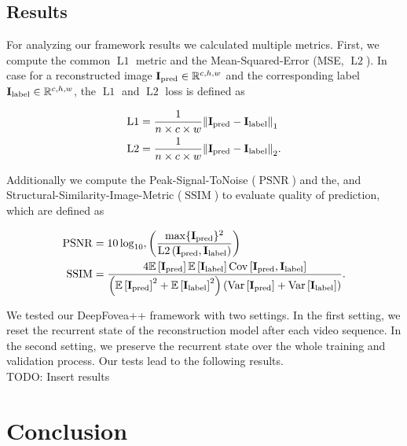 \documentclass[10pt,twocolumn,letterpaper]{article}
\newcommand{\Tensor}[1]{\boldsymbol{\mathrm{\MakeUppercase{#1}}}}
\newcommand{\Set}[1]{\mathbb{#1}}
\newcommand{\Mean}[1]{\mathbb{E}\left[#1\right]}
\newcommand{\Var}[1]{\mathrm{Var}\left[#1\right]}
\newcommand{\Cov}[1]{\mathrm{Cov}\left[#1\right]}
\begin{document}
\subsection{Results} %
For analyzing our framework results we calculated multiple metrics. First, we compute the common $\operatorname{L1}$ metric and the Mean-Squared-Error (MSE, $\operatorname{L2}$). In case for a reconstructed image $\Tensor{I}_{\text{pred}}\in\Set{R}^{c, h, w}$ and the corresponding label $\Tensor{I}_{\text{label}}\in\Set{R}^{c, h, w}$, the $\operatorname{L1}$ and $\operatorname{L2}$ loss is defined as

\begin{align}
    \operatorname{L1} &= \frac{1}{n\times c\times w}\norm{\Tensor{I}_{\text{pred}} - \Tensor{I}_{\text{label}}}_{1}\\
    \operatorname{L2} &= \frac{1}{n\times c\times w}\norm{\Tensor{I}_{\text{pred}} - \Tensor{I}_{\text{label}}}_{2}.
\end{align}

Additionally we compute the Peak-Signal-ToNoise ($\operatorname{PSNR}$) and the, and Structural-Similarity-Image-Metric ($\operatorname{SSIM}$) \cite{ssmi} to evaluate quality of prediction, which are defined as

\begin{align}
    \operatorname{PSNR}&=10 \log_{10},\left(\frac{\max\{\Tensor{I}_{\text{pred}}\}^2}{\operatorname{L2}\left(\Tensor{I}_{\text{pred}}, \Tensor{I}_{\text{label}}\right)} \right)\\
    \operatorname{SSIM}&=\frac{4\Mean{\Tensor{I}_{\text{pred}}}\Mean{\Tensor{I}_{\text{label}}}\Cov{\Tensor{I}_{\text{pred}}, \Tensor{I}_{\text{label}}}}{\left(\Mean{\Tensor{I}_{\text{pred}}}^2 + \Mean{\Tensor{I}_{\text{label}}}^2\right)\left(\Var{\Tensor{I}_{\text{pred}}} + \Var{\Tensor{I}_{\text{label}}}\right)}.
\end{align}

We tested our DeepFovea++ framework with two settings. In the first setting, we reset the recurrent state of the reconstruction model after each video sequence. In the second setting, we preserve the recurrent state over the whole training and validation process. Our tests lead to the following results.\\

TODO: Insert results\\

\section{Conclusion} %
\end{document}
